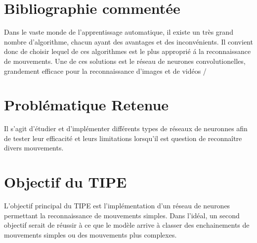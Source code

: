 \documentclass[a4paper, 11pt]{article}
\let\cite=\supercite
\begin{document}
\section*{Bibliographie comment\'ee}

Dans le vaste monde de l'apprentissage automatique, il existe un très grand nombre
d'algorithme, chacun ayant des avantages et des inconvénients. Il convient donc de
choisir lequel de ces algorithmes est le plus approprié á la reconnaissance de
mouvements.
Une de ces solutions est le réseau de neurones convolutionelles, grandement efficace
pour la reconnaissance d'images et de vidéos /\cite{cnn}

\section*{Probl\'ematique Retenue}
Il s'agit d'étudier et d'implémenter différents types de réseaux de neuronnes afin de
tester leur efficacité et leurs limitations lorsqu'il est question de reconnaître 
divers mouvements.

\section*{Objectif du TIPE}
\begin{enumerate}
    L'objectif principal du TIPE est l'implémentation d'un réseau de neurones
    permettant la reconnaissance de mouvements simples. Dans l'idéal, un second objectif
    serait de réussir à ce que le modèle arrive à classer des enchainements de mouvements
    simples ou des mouvements plus complexes.
\end{enumerate}


\printbibliography[title=Références bibliographiques]
\end{document}
